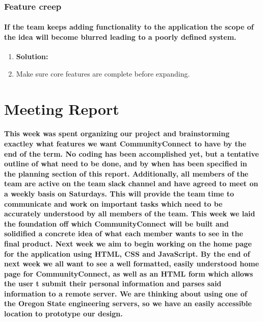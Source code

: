 \documentclass[12pt]{article}
\begin{document}
		\subsubsection{\bf Feature creep}
			\paragraph{\normalfont If the team keeps adding functionality to the application the scope of the idea will become blurred leading to a poorly defined system.}
			\begin{enumerate}
				\item \bf Solution:
				\item Make sure core features are complete before expanding.
			\end{enumerate}

\section{\bf Meeting Report}
    \paragraph{\normalfont \indent This week was spent organizing our project and brainstorming exactley what features we want CommunityConnect to have by the end of the term. No coding has been accomplished yet, but a tentative outline of what need to be done, and by when has been specified in the planning section of this report. Additionally, all members of the team are active on the team slack channel and have agreed to meet on a weekly basis on Saturdays. This will provide the team time to communicate and work on important tasks which need to be accurately understood by all members of the team. This week we laid the foundation off which CommunityConnect will be built and solidified a concrete idea of what each member wants to see in the final product. Next week we aim to begin working on the home page for the application using HTML, CSS and JavaScript. By the end of next week we all want to see a well formatted, easily understood home page for CommunityConnect, as well as an HTML form which allows the user t submit their personal information and parses said information to a remote server. We are thinking about using one of the Oregon State engineering servers, so we have an easily accessible location to prototype our design.
    }
\end{document}
